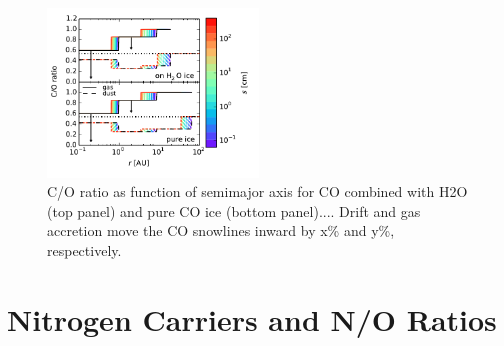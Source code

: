 \documentclass[apj]{emulateapj}
\begin{document}

\begin{figure}[h!]
\centering
\includegraphics[width=0.5\textwidth]{../../figs/C_O_water_ice.pdf}
\caption{C/O ratio as function of semimajor axis for CO combined with H2O (top panel) and pure CO ice (bottom panel).... Drift and gas accretion move the CO snowlines inward by x\% and y\%, respectively.} 
\label{fig:CO_ratio}
\end{figure}

\section{Nitrogen Carriers and N/O Ratios}
\end{document}
